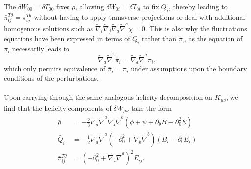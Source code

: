 \documentclass[10pt,letterpaper]{article}
\numberwithin{equation}{subsection}
\begin{document}
The $\delta W_{00} = \delta T_{00}$ fixes $\rho$, allowing $\delta W_{0i} = \delta T_{0i}$ to fix $Q_i$, thereby leading to $\bar\pi_{ij}^{T\theta} = \pi_{ij}^{T\theta}$ without having to apply transverse projections or deal with additional homogenous solutions such as $\tilde\nabla_i\tilde\nabla_j \tilde\nabla_a\tilde\nabla^a \chi = 0$. This is also why the fluctuations equations have been expressed in terms of $Q_i$ rather than $\pi_i$, as the equation of $\pi_i$ necessarily leads to 
\begin{equation}
\tilde\nabla_a\tilde\nabla^a \bar \pi_i = \tilde\nabla_a \tilde\nabla^a \pi_i,
\end{equation}
which only permits equivalence of $\bar\pi_i = \pi_i$ under assumptions upon the boundary conditions of the perturbations. 
\\ \\
Upon carrying through the same analogous helicity decomposition on $K_{\mu\nu}$, we find that the helicity components of $\delta W_{\mu\nu}$ take the form
\begin{align}
\bar \rho &= -\frac{2}{3} \tilde{\nabla}_a\tilde{\nabla}^a\tilde{\nabla}_b\tilde{\nabla}^b (\phi + \psi +\partial_0{B}-\partial_0^2{E}) 
\nonumber\\
\bar Q_i &= -\frac{1}{2} \tilde{\nabla}_a\tilde{\nabla}^a\left(-\partial_0^2+\tilde{\nabla}_b\tilde{\nabla}^b\right)(B_i - \partial_0{E}_i)
\nonumber \\
\bar \pi_{ij}^{T\theta} &= \left(-\partial_0^2 + \tilde\nabla_a\tilde\nabla^a\right)^2 E_{ij}.
\end{align}
\end{document}
